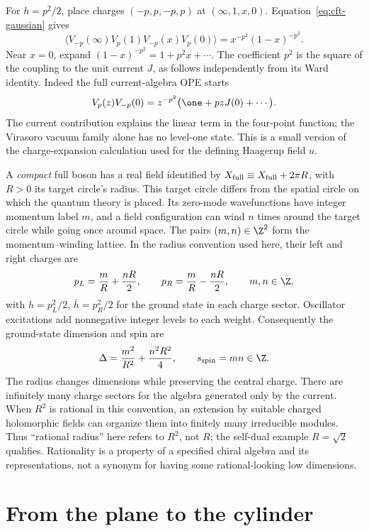 \begin{example}
For $h=p^2/2$, place charges $(-p,p,-p,p)$ at
$(\infty,1,x,0)$. Equation~\eqref{eq:cft-gaussian} gives
\[
 \langle V_{-p}(\infty)V_p(1)V_{-p}(x)V_p(0)\rangle
 =x^{-p^2}(1-x)^{-p^2}.
\]
Near $x=0$, expand $(1-x)^{-p^2}=1+p^2x+\cdots$.
The coefficient $p^2$ is the square of the coupling to the unit
current $J$, as follows independently from its Ward identity.
Indeed the full current-algebra OPE starts
\[
 V_p(z)V_{-p}(0)
 =z^{-p^2}\bigl(\one+pzJ(0)+\cdots\bigr).
\]
The current contribution explains the linear term in the four-point
function; the Virasoro vacuum family alone has no level-one state.
This is a small version of the charge-expansion calculation used for
the defining Haagerup field $u$.
\end{example}

A \emph{compact} full boson has a real field identified by
$X_{\rm full}\equiv X_{\rm full}+2\pi R$, with $R>0$ its target
circle's radius. This target circle differs from the spatial circle
on which the quantum theory is placed. Its zero-mode wavefunctions
have integer momentum label $m$, and a field configuration can wind
$n$ times around the target circle while going once around space.
The pairs $(m,n)\in\Z^2$ form the momentum--winding lattice.
In the radius convention used here, their left and right charges are
\[
 p_L=\frac mR+\frac{nR}{2},\qquad
 p_R=\frac mR-\frac{nR}{2},\qquad m,n\in\Z,
\]
with $h=p_L^2/2$, $\bar h=p_R^2/2$ for the ground state in each
charge sector. Oscillator excitations add nonnegative integer levels
to each weight. Consequently the ground-state dimension and spin are
\[
 \Delta=\frac{m^2}{R^2}+\frac{n^2R^2}{4},\qquad
 s_{\rm spin}=mn\in\Z.
\]
The radius changes dimensions while preserving the central charge.
There are infinitely many charge sectors for the algebra generated
only by the current. When $R^2$ is rational in this convention, an
extension by suitable charged holomorphic fields can organize them
into finitely many irreducible modules. Thus ``rational radius'' here
refers to $R^2$, not $R$; the self-dual example $R=\sqrt2$ qualifies.
Rationality is a property of a specified chiral algebra and its
representations, not a synonym for having some rational-looking
low dimensions.

\section{From the plane to the cylinder}

